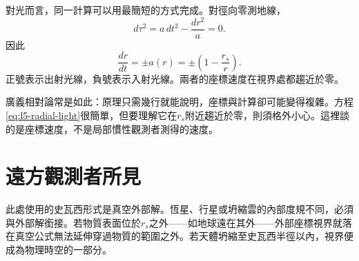 對光而言，同一計算可以用最簡短的方式完成。對徑向零測地線，
\begin{equation}
d\tau^2
=a\,dt^2-\frac{dr^2}{a}=0.
\end{equation}
因此
\begin{equation}
\boxed{
\frac{dr}{dt}
=\pm a(r)
=\pm\left(1-\frac{r_s}{r}\right).
}
\label{eq:l5-radial-light}
\end{equation}
正號表示出射光線，負號表示入射光線。兩者的座標速度在視界處都趨近於零。

\begin{classroomqa}
\end{classroomqa}

廣義相對論常是如此：原理只需幾行就能說明，座標與計算卻可能變得複雜。方程\eqref{eq:l5-radial-light}很簡單，但要理解它在\(r_s\)附近趨近於零，則須格外小心。這裡談的是座標速度，不是局部慣性觀測者測得的速度。

\section{遠方觀測者所見}

\begin{classroomqa}
\end{classroomqa}

\begin{classroomqa}
\end{classroomqa}

此處使用的史瓦西形式是真空外部解。恆星、行星或坍縮雲的內部度規不同，必須與外部解銜接。若物質表面位於\(r_s\)之外——如地球遠在其外——外部座標視界就落在真空公式無法延伸穿過物質的範圍之外。若天體坍縮至史瓦西半徑以內，視界便成為物理時空的一部分。

